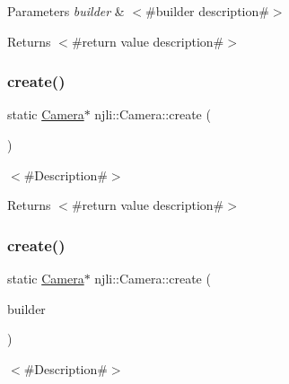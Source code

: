 \begin{DoxyParams}{Parameters}
{\em builder} & $<$\#builder description\#$>$\\
\hline
\end{DoxyParams}
\begin{DoxyReturn}{Returns}
$<$\#return value description\#$>$ 
\end{DoxyReturn}
\mbox{\label{classnjli_1_1_camera_a507f7feb6c03019a86782cc8b13ba0a8}} 
\subsubsection{\texorpdfstring{create()}{create()}\hspace{0.1cm}{\footnotesize\ttfamily [2/3]}}
{\footnotesize\ttfamily static \mbox{\hyperlink{classnjli_1_1_camera}{Camera}}$\ast$ njli\+::\+Camera\+::create (\begin{DoxyParamCaption}{ }\end{DoxyParamCaption})\hspace{0.3cm}{\ttfamily [static]}}

$<$\#\+Description\#$>$

\begin{DoxyReturn}{Returns}
$<$\#return value description\#$>$ 
\end{DoxyReturn}
\mbox{\label{classnjli_1_1_camera_ae45ea6022038204bea9fc3dc39f978c9}} 
\subsubsection{\texorpdfstring{create()}{create()}\hspace{0.1cm}{\footnotesize\ttfamily [3/3]}}
{\footnotesize\ttfamily static \mbox{\hyperlink{classnjli_1_1_camera}{Camera}}$\ast$ njli\+::\+Camera\+::create (\begin{DoxyParamCaption}\item[{const \mbox{\hyperlink{classnjli_1_1_camera_builder}{Camera\+Builder}} \&}]{builder }\end{DoxyParamCaption})\hspace{0.3cm}{\ttfamily [static]}}

$<$\#\+Description\#$>$


